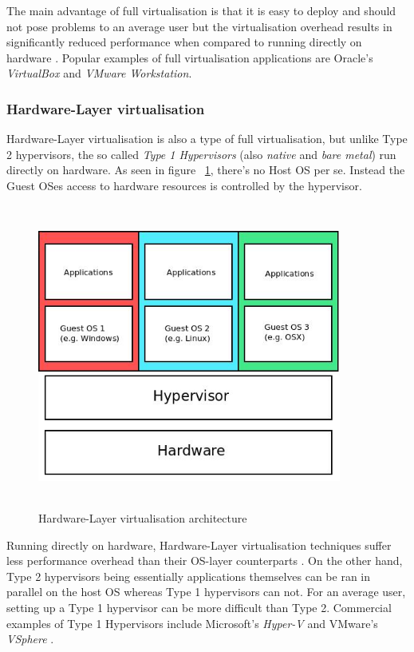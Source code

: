 The main advantage of full virtualisation is that it is easy to deploy and should not pose problems to an average user but the virtualisation overhead results in significantly reduced performance when compared to running directly on hardware \cite{taxonomy}. Popular examples of full virtualisation applications are Oracle's \textit{VirtualBox}\cite{VirtualBox} and \textit{VMware Workstation}\cite{WorkStation}. 

\subsubsection{Hardware-Layer virtualisation}

Hardware-Layer virtualisation is also a type of full virtualisation, but unlike Type 2 hypervisors, the so called \textit{Type 1 Hypervisors} (also \textit{native} and \textit{bare metal}) run directly on hardware. As seen in figure ~\ref{fig:hardware}, there's no Host OS per se. Instead the Guest OSes access to hardware resources is controlled by the hypervisor.

\begin{figure}[ht!]
\centering
  \includegraphics[width=10cm,height=10cm, keepaspectratio]{hwlayer.jpeg}%
  \caption{Hardware-Layer virtualisation architecture}
  \label{fig:hardware}
\end{figure}

Running directly on hardware, Hardware-Layer virtualisation techniques suffer less performance overhead than their OS-layer counterparts \cite{taxonomy}. On the other hand, Type 2 hypervisors being essentially applications themselves can be ran in parallel on the host OS whereas Type 1 hypervisors can not. For an average user, setting up a Type 1 hypervisor can be more difficult than Type 2. Commercial examples of Type 1 Hypervisors include Microsoft's \textit{Hyper-V}\cite{hyperv} and VMware's \textit{VSphere} \cite{vsphere}.

